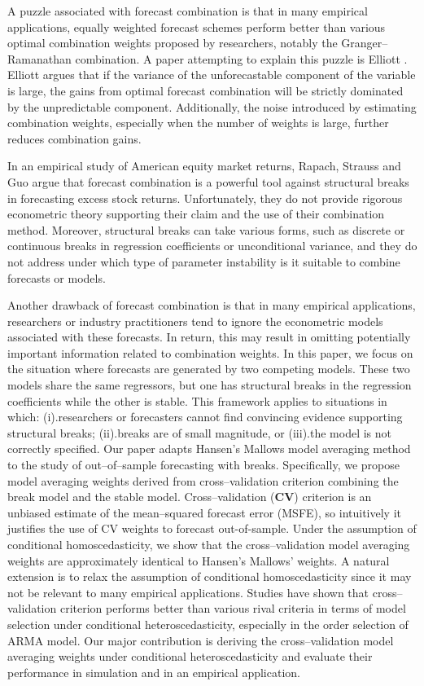 A puzzle associated with forecast combination is that in many empirical applications, equally weighted forecast schemes perform better than various optimal combination weights proposed by researchers, notably the Granger--Ramanathan combination. A paper attempting to explain this puzzle is Elliott \cite{elliott11}. Elliott argues that if the variance of the unforecastable component of the variable is large, the gains from optimal forecast combination will be strictly dominated by the unpredictable component. Additionally, the noise introduced by estimating combination weights, especially when the number of weights is large, further reduces combination gains.

In an empirical study of American equity market returns, Rapach, Strauss and Guo \cite{rsz2010} argue that forecast combination is a powerful tool against structural breaks in forecasting excess stock returns. Unfortunately, they do not provide rigorous econometric theory supporting their claim and the use of their combination method. Moreover, structural breaks can take various forms, such as discrete or continuous breaks in regression coefficients or unconditional variance, and they do not address under which type of parameter instability is it suitable to combine forecasts or models.

Another drawback of forecast combination is that in many empirical applications, researchers or industry practitioners tend to ignore the econometric models associated with these forecasts. In return, this may result in omitting potentially important information related to combination weights. In this paper, we focus on the situation where forecasts are generated by two competing models. These two models share the same regressors, but one has structural breaks in the regression coefficients while the other is stable. This framework applies to situations in which: (i).researchers or forecasters cannot find convincing evidence supporting structural breaks; (ii).breaks are of small magnitude, or (iii).the model is not correctly specified. Our paper adapts Hansen's Mallows model averaging method \cite{hansen2009averaging} to the study of out--of--sample forecasting with breaks. Specifically, we propose model averaging weights derived from cross--validation criterion combining the break model and the stable model. Cross--validation (\textbf{CV}) criterion is an unbiased estimate of the mean--squared forecast error (MSFE), so intuitively it justifies the use of CV weights to forecast out-of-sample. Under the assumption of conditional homoscedasticity, we show that the cross--validation model averaging weights are approximately identical to Hansen's Mallows' weights. A natural extension is to relax the assumption of conditional homoscedasticity since it may not be relevant to many empirical applications. Studies have shown that cross--validation criterion performs better than various rival criteria in terms of model selection under conditional heteroscedasticity, especially in the order selection of ARMA model. Our major contribution is deriving the cross--validation model averaging weights under conditional heteroscedasticity and evaluate their performance in simulation and in an empirical application. 